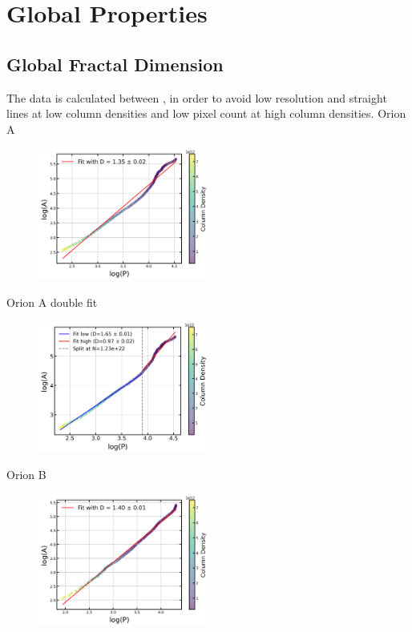 \section{Global Properties}

\subsection{Global Fractal Dimension}

The data is calculated between , in order to avoid low resolution and straight lines at low column densities and low pixel count at high column densities.
Orion A

\begin{figure}[t]
    \centering
    \includegraphics[width=0.5\textwidth]{figures/orion_A_global.png}
    \caption{}
    \label{fig:orion_A_global}
\end{figure}

Orion A double fit

\begin{figure}[t]
    \centering
    \includegraphics[width=0.5\textwidth]{figures/orion_A_global_double_fit.png}
    \caption{}
    \label{fig:orion_A_global_double_fit}
\end{figure}

Orion B

\begin{figure}[t]
    \centering
    \includegraphics[width=0.5\textwidth]{figures/orion_B_global.png}
    \caption{}
    \label{fig:orion_B}
\end{figure}

